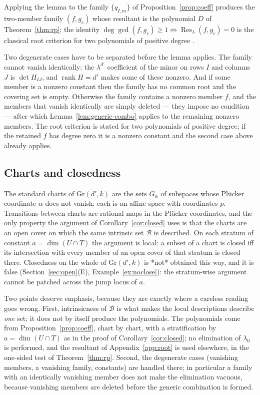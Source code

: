 \documentclass[journal]{IEEEtran}
\theoremstyle{plainn}
\theoremstyle{remark}
\begin{document}
Applying the lemma to the family $\{q_{I,m}\}$ of Proposition~\ref{prop:coeff} produces the two-member
family $(f,g_c)$ whose resultant is the polynomial $D$ of Theorem~\ref{thm:rp}; the identity
$\deg\gcd(f,g_c)\ge1\iff\operatorname{Res}_\lambda(f,g_c)=0$ is the classical root criterion for two
polynomials of positive degree \cite[Ch.~6]{vzgg13}.

Two degenerate cases have to be separated before the lemma applies. The family cannot vanish
identically: the $\lambda^{d'}$ coefficient of the minor on rows $I$ and columns $J$ is $\det H_{IJ}$, and
$\operatorname{rank}H=d'$ makes some of these nonzero. And if some member is a nonzero constant then the
family has no common root and the covering set is empty. Otherwise the
family contains a nonzero member $f$, and the members that vanish identically are simply deleted ---
they impose no condition --- after which Lemma~\ref{lem:generic-combo} applies to the remaining
nonzero members. The root criterion is stated for two polynomials of positive degree; if the retained
$f$ has degree zero it is a nonzero constant and the second case above already applies.

\subsection{Charts and closedness}\label{app:charts}

The standard charts of $\mathrm{Gr}(d',k)$ are the sets $G_\alpha$ of subspaces whose Plücker
coordinate $\alpha$ does not vanish; each is an affine space with coordinates $p$. Transitions between
charts are rational maps in the Plücker coordinates, and the only property the argument of
Corollary~\ref{cor:closed} uses is that the charts are an open cover on which the same intrinsic set
$\mathcal B$ is described. On each stratum of constant $a=\dim(U\cap T)$ the argument is local: a subset of a chart is closed iff its
intersection with every member of an open cover of that stratum is closed there. Closedness on the whole of
$\mathrm{Gr}(d',k)$ is *not* obtained this way, and it is false
(Section~\ref{sec:open}(E), Example~\ref{ex:noclose}): the stratum-wise argument cannot be patched
across the jump locus of $a$.

Two points deserve emphasis, because they are exactly where a careless reading goes wrong.
First, intrinsicness of $\mathcal B$ is what makes the local descriptions describe \emph{one} set; it
does not by itself produce the polynomials. The polynomials come from
Proposition~\ref{prop:coeff}, chart by chart, with a stratification by $a=\dim(U\cap T)$ as in the proof
of Corollary~\ref{cor:closed}; no elimination of $\lambda_0$ is performed, and the resultant of
Appendix~\ref{app:root} is used elsewhere, in the one-sided test of Theorem~\ref{thm:rp}. Second, the degenerate cases
(vanishing members, a vanishing family, constants) are handled there; in particular a family with an
identically vanishing member does not make the elimination vacuous, because vanishing members are
deleted before the generic combination is formed.
\end{document}
